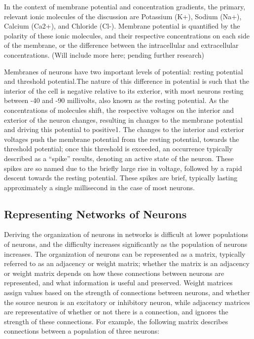 \documentclass{article}
\begin{document}
In the context of membrane potential and concentration gradients, the primary, relevant ionic molecules of the discussion are Potassium (K+), Sodium (Na+), Calcium (Ca2+), and Chloride (Cl-). Membrane potential is quantified by the polarity of these ionic molecules, and their respective concentrations on each side of the membrane, or the difference between the intracellular and extracellular concentrations. (Will include more here; pending further research)\par
Membranes of neurons have two important levels of potential: resting potential and threshold potential.The nature of this difference in potential is such that the interior of the cell is negative relative to its exterior, with most neurons resting between -40 and -90 millivolts, also known as the resting potential. As the concentrations of molecules shift, the respective voltages on the interior and exterior of the neuron changes, resulting in changes to the membrane potential and driving this potential to positive1. The changes to the interior and exterior voltages push the membrane potential from the resting potential, towards the threshold potential; once this threshold is exceeded, an occurrence typically described as a “spike” results, denoting an active state of the neuron. These spikes are so named due to the briefly large rise in voltage, followed by a rapid descent towards the resting potential. These spikes are brief, typically lasting approximately a single millisecond in the case of most neurons.\par 
\subsection{Representing Networks of Neurons}
Deriving the organization of neurons in networks is difficult at lower populations of neurons, and the difficulty increases significantly as the population of neurons increases. The organization of neurons can be represented as a matrix, typically referred to as an adjacency or weight matrix; whether the matrix is an adjacency or weight matrix depends on how these connections between neurons are represented, and what information is useful and preserved. Weight matrices assign values based on the strength of connections between neurons, and whether the source neuron is an excitatory or inhibitory neuron, while adjacency matrices are representative of whether or not there is a connection, and ignores the strength of these connections. For example, the following matrix describes connections between a population of three neurons:\par
\end{document}
